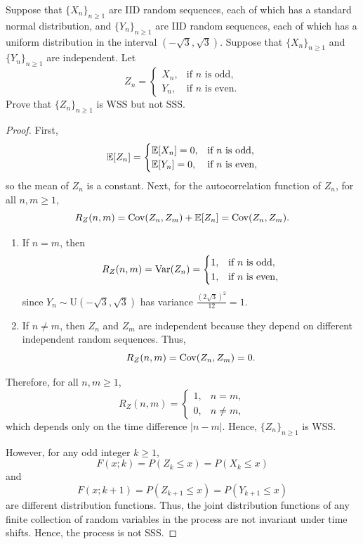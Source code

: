 \begin{example}
  Suppose that \(\{X_n\}_{n \geq 1}\) are IID random sequences, each of which has a standard normal distribution, and \(\{Y_n\}_{n \geq 1}\) are IID random sequences, each of which has a uniform distribution in the interval \((-\sqrt{3}, \sqrt{3})\). Suppose that \(\{X_n\}_{n \geq 1}\) and \(\{Y_n\}_{n \geq 1}\) are independent. Let
  \[
    Z_n = \begin{cases}
      X_n, & \text{if } n \text{ is odd}, \\
      Y_n, & \text{if } n \text{ is even}.
    \end{cases}
  \]
  Prove that \(\{Z_n\}_{n \geq 1}\) is WSS but not SSS.
\end{example}
\begin{proof}
  First,
  \[
    \mathbb{E}[Z_n] = \begin{cases}
      \mathbb{E}[X_n] = 0, & \text{if } n \text{ is odd}, \\
      \mathbb{E}[Y_n] = 0, & \text{if } n \text{ is even},
    \end{cases}
  \]
  so the mean of \(Z_n\) is a constant.
  Next, for the autocorrelation function of \(Z_n\), for all \(n, m \geq 1\),
  \[
    R_Z(n, m) = \mathrm{Cov}(Z_n, Z_m) + \mathbb{E}[Z_n] = \mathrm{Cov}(Z_n, Z_m).
  \]
  \begin{enumerate}
    \item If \(n = m\), then
    \[
      R_Z(n, m) = \mathrm{Var}(Z_n) = \begin{cases}
        1, & \text{if } n \text{ is odd}, \\
        1, & \text{if } n \text{ is even},
      \end{cases}
    \]
    since \(Y_n \sim \mathrm{U}(-\sqrt{3}, \sqrt{3})\) has variance \(\frac{(2\sqrt{3})^2}{12} = 1\).
    \item If \(n \neq m\), then \(Z_n\) and \(Z_m\) are independent because they depend on different independent random sequences. Thus,
    \[
      R_Z(n, m) = \mathrm{Cov}(Z_n, Z_m) = 0.
    \]
  \end{enumerate}
  Therefore, for all \(n, m \geq 1\),
  \[
    R_Z(n, m) = \begin{cases}
      1, & n = m, \\
      0, & n \neq m,
    \end{cases}
  \]
  which depends only on the time difference \(|n - m|\). Hence, \(\{Z_n\}_{n \geq 1}\) is WSS.

  However, for any odd integer \(k \geq 1\),
  \[
    F(x; k) = P(Z_k \leq x) = P(X_k \leq x)
  \]
  and
  \[
    F(x; k + 1) = P(Z_{k + 1} \leq x) = P(Y_{k + 1} \leq x)
  \]
  are different distribution functions. Thus, the joint distribution functions of any finite collection of random variables in the process are not invariant under time shifts. Hence, the process is not SSS.
\end{proof}


